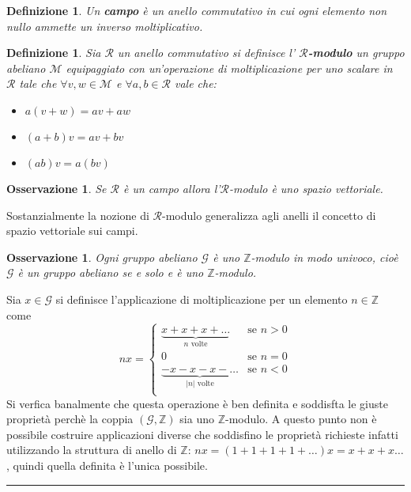 \documentclass[10pt, twoside=false, x11names]{scrbook}
\newtheorem{osservation}[theorem]{Osservazione}
\newtheorem{definition}[theorem]{Definizione}
\newenvironment{proof}{{\textbf{Dimostrazione}:}}{\hfill\rule{2mm}{2mm} \newline}
\newcommand{\R}{\mathcal{R}}
\newcommand{\M}{\mathcal{M}}
\newcommand{\Z}{\mathbb{Z}}
\begin{document}
\begin{definition}
  Un \textbf{campo}  è un anello commutativo in cui ogni elemento non nullo ammette
  un inverso moltiplicativo.
\end{definition}

\begin{definition}
  Sia $ \R $ un anello commutativo si definisce l' \textbf{$ \R $-modulo} \index{$ \R $-modulo}
  un gruppo abeliano $ \M $ equipaggiato con un'operazione di moltiplicazione per uno scalare in $ \R $
  tale che $ \forall v,w \in \M $ e $ \forall a,b \in \R $ vale che:
  \begin{itemize}
  \item $ a(v + w) = av + aw $
  \item $ (a + b)v = av + bv $
  \item $ (ab)v = a(bv) $
  \end{itemize}
\end{definition}

\begin{osservation}
  Se $ \R $ è un campo allora l'$ \R $-modulo è uno spazio vettoriale.
\end{osservation}
Sostanzialmente la nozione di $ \R $-modulo generalizza agli anelli il concetto di spazio vettoriale sui campi.

\begin{osservation}
  Ogni gruppo abeliano $ \mathcal{G} $ è uno $ \Z $-modulo in modo univoco, cioè $ \mathcal{G} $ è un
  gruppo abeliano se e solo e è uno $ \Z $-modulo.
\end{osservation}
\begin{proof}
  Sia $ x \in \mathcal{G} $ si definisce l'applicazione di moltiplicazione per un elemento $ n \in \Z $ come
  \[
    nx =
    \begin{cases}
      \underbrace{ x + x + x + \dots}_{n \text{ volte}} & \text{se } n > 0 \\
      0 & \text{se } n = 0 \\
       \underbrace{ - x - x - x - \dots}_{|n| \text{ volte}} & \text{se } n < 0 \\
    \end{cases}
  \]
  Si verfica banalmente che questa operazione è ben definita e soddisfta
  le giuste proprietà perchè la coppia $ (\mathcal{G}, \Z) $ sia uno $ \Z $-modulo.
  A questo punto non è possibile costruire applicazioni diverse che soddisfino le
  proprietà richieste infatti utilizzando la struttura di anello di $ \Z $:
  $ n x = (1 + 1 + 1 + 1 + \dots) x = x + x + x \dots $, quindi quella definita
  è l'unica possibile.
\end{proof}
\end{document}
